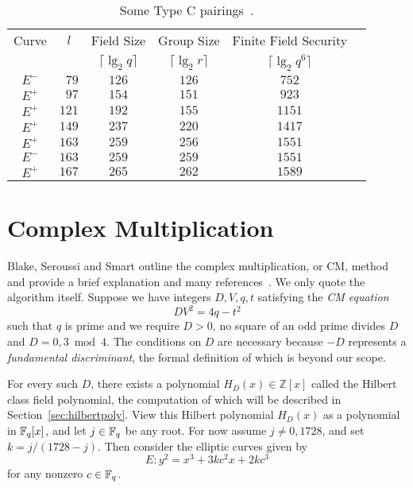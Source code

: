 \begin{table}
\begin{center}
\begin{tabular}{|c|c|c|c|c|c|}

  \hline
  Curve & $l$ & Field       Size      & Group Size         & Finite Field Security \\
        &     & $\lceil\lg_2 q \rceil$ & $\lceil \lg_2 r \rceil$ &
    $\lceil \lg_2 {q^6} \rceil$ \\

  \hline
  $E^-$ & $\phantom079$ & $126$ & $126$ & $752$ \\
  \hline
  $E^+$ & $\phantom097$  & $154$ & $151$ & $923$ \\
  \hline
  $E^+$ & $121$ & $192$ & $155$ & $1151$ \\
  \hline
  $E^+$ & $149$ & $237$ & $220$ & $1417$ \\
  \hline
  $E^+$ & $163$ & $259$ & $256$ & $1551$ \\
  \hline
  $E^-$ & $163$ & $259$ & $259$ & $1551$ \\
  \hline
  $E^+$ & $167$ & $265$ & $262$ & $1589$ \\
  \hline
\end{tabular}
\end{center}
\caption{  \label{tbl:typec}
  Some Type C pairings~\cite{bls}.
}
\end{table}

\section {\label{sec:cm}Complex Multiplication}

Blake, Seroussi and Smart outline the complex multiplication, or CM,
method and provide a brief explanation and many
references~\cite{bss}. We only quote the algorithm itself.
Suppose we have integers $D, V, q, t$ satisfying the \emph{CM equation}
\[ D V^2 = 4 q - t^2 \]
such that $q$ is prime and we require $D > 0$, no
square of an odd prime divides $D$ and
$D = 0, 3 \bmod 4$. The conditions on $D$ are necessary
because $-D$ represents a \emph{fundamental discriminant},
the formal definition of which is beyond our scope.

For every such $D$, there exists a polynomial $H_D(x) \in \mathbb{Z}[x]$
called the Hilbert class field polynomial, the computation of which
will be described in Section~\ref{sec:hilbertpoly}.
View this Hilbert polynomial $H_D(x)$ as a polynomial in $\mathbb{F}_q[x]$,
and let $j \in \mathbb{F}_q$ be any root. For now assume $j \ne 0, 1728$,
and set
$k = j / (1728 - j)$. Then consider the elliptic curves given by
\[ E: y^2 = x^3 + 3 k c^2 x + 2 k c^3 \]
for any nonzero $c \in \mathbb{F}_q$.

